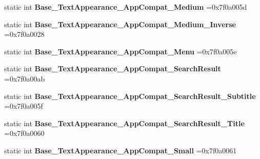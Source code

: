 \begin{DoxyCompactItemize}
static int {\bfseries Base\+\_\+\+Text\+Appearance\+\_\+\+App\+Compat\+\_\+\+Medium} =0x7f0a005d
\item 
\mbox{\label{classandroid_1_1support_1_1graphics_1_1drawable_1_1R_1_1style_a19806289f0c81bd2672dea8192a6f2fa}} 
static int {\bfseries Base\+\_\+\+Text\+Appearance\+\_\+\+App\+Compat\+\_\+\+Medium\+\_\+\+Inverse} =0x7f0a0028
\item 
\mbox{\label{classandroid_1_1support_1_1graphics_1_1drawable_1_1R_1_1style_a487bbb198ca784ebdd08c37d381b92b0}} 
static int {\bfseries Base\+\_\+\+Text\+Appearance\+\_\+\+App\+Compat\+\_\+\+Menu} =0x7f0a005e
\item 
\mbox{\label{classandroid_1_1support_1_1graphics_1_1drawable_1_1R_1_1style_a7dff3dec401de442a351473056e13c02}} 
static int {\bfseries Base\+\_\+\+Text\+Appearance\+\_\+\+App\+Compat\+\_\+\+Search\+Result} =0x7f0a00ab
\item 
\mbox{\label{classandroid_1_1support_1_1graphics_1_1drawable_1_1R_1_1style_a58bb632307e640d8eeab065fc03379cc}} 
static int {\bfseries Base\+\_\+\+Text\+Appearance\+\_\+\+App\+Compat\+\_\+\+Search\+Result\+\_\+\+Subtitle} =0x7f0a005f
\item 
\mbox{\label{classandroid_1_1support_1_1graphics_1_1drawable_1_1R_1_1style_aa73e8a2f41f6c7aee09a782c2f7260ea}} 
static int {\bfseries Base\+\_\+\+Text\+Appearance\+\_\+\+App\+Compat\+\_\+\+Search\+Result\+\_\+\+Title} =0x7f0a0060
\item 
\mbox{\label{classandroid_1_1support_1_1graphics_1_1drawable_1_1R_1_1style_ae6bf4b270ea6414211660750abf7e5c7}} 
static int {\bfseries Base\+\_\+\+Text\+Appearance\+\_\+\+App\+Compat\+\_\+\+Small} =0x7f0a0061
\item 
\mbox{\label{classandroid_1_1support_1_1graphics_1_1drawable_1_1R_1_1style_ac4d159d28b7b143b6fef63a92129bf97}} 

\end{DoxyCompactItemize}
